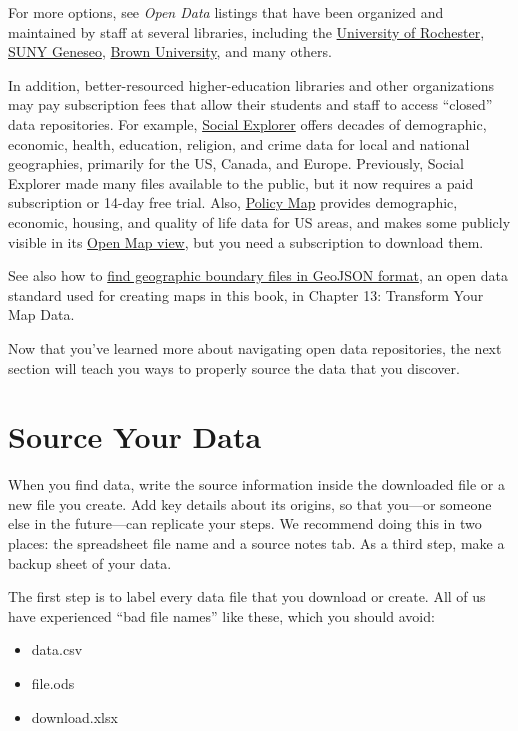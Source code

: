 \documentclass[
  english,
]{book}
\providecommand{\tightlist}{%
  \setlength{\itemsep}{0pt}\setlength{\parskip}{0pt}}
\begin{document}
For more options, see \emph{Open Data} listings that have been organized and maintained by staff at several libraries, including the \href{https://libguides.lib.rochester.edu/c.php?g=384429}{University of Rochester}, \href{https://libguides.geneseo.edu/data}{SUNY Geneseo}, \href{https://libguides.brown.edu/opendata}{Brown University}, and many others.

In addition, better-resourced higher-education libraries and other organizations may pay subscription fees that allow their students and staff to access ``closed'' data repositories. For example, \href{https://www.socialexplorer.com/}{Social Explorer} offers decades of demographic, economic, health, education, religion, and crime data for local and national geographies, primarily for the US, Canada, and Europe. Previously, Social Explorer made many files available to the public, but it now requires a paid subscription or 14-day free trial. Also, \href{https://www.policymap.com/}{Policy Map} provides demographic, economic, housing, and quality of life data for US areas, and makes some publicly visible in its \href{https://www.policymap.com/maps}{Open Map view}, but you need a subscription to download them.

See also how to \href{find-geojson.html}{find geographic boundary files in GeoJSON format}, an open data standard used for creating maps in this book, in Chapter 13: Transform Your Map Data.

Now that you've learned more about navigating open data repositories, the next section will teach you ways to properly source the data that you discover.

\hypertarget{source}{%
\section*{Source Your Data}\label{source}}

When you find data, write the source information inside the downloaded file or a new file you create. Add key details about its origins, so that you---or someone else in the future---can replicate your steps. We recommend doing this in two places: the spreadsheet file name and a source notes tab. As a third step, make a backup sheet of your data.

The first step is to label every data file that you download or create. All of us have experienced ``bad file names'' like these, which you should avoid:

\begin{itemize}
\tightlist
\item
  data.csv
\item
  file.ods
\item
  download.xlsx
\end{itemize}
\end{document}
